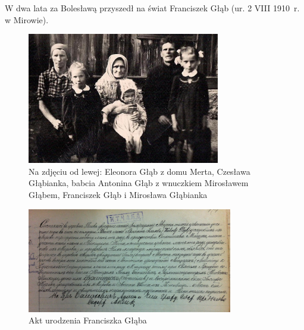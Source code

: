 W dwa lata za Bolesławą przyszedł na świat Franciszek Głąb (ur. 2 VIII 1910~r. w Mirowie).

\begin{figure}
\begin{center}
\includegraphics[width=0.75\textwidth]{zdjecia/rodzina_eleonory_franciszka_glabow.jpg}
\caption[Rodzina Franciszka i Eleonory Głąbów z babcią Antoniną]{Na zdjęciu od lewej: Eleonora Głąb z domu Merta, Czesława Głąbianka, babcia Antonina Głąb z wnuczkiem Mirosławem Głąbem, Franciszek Głąb i Mirosława Głąbianka}
\label{rys:akt_urodzenia_franciszka_glaba}
\end{center}
\end{figure}

\begin{figure}
\begin{center}
\includegraphics[width=0.8\textwidth]{zdjecia/akt_urodzenia_franciszka_glaba.jpg}
\caption{Akt urodzenia Franciszka Głąba}
\label{rys:akt_urodzenia_franciszka_glaba}
\end{center}
\end{figure}




